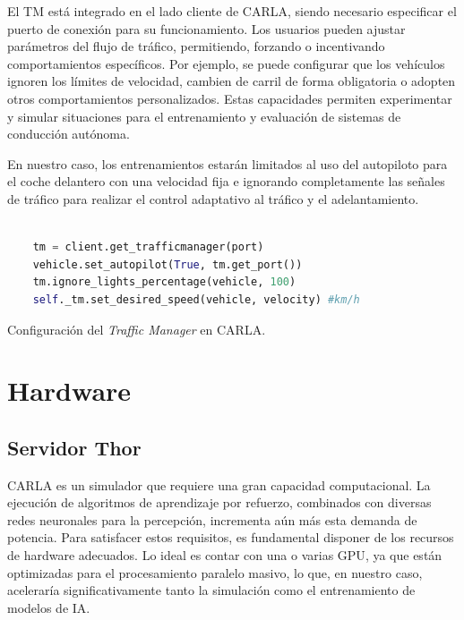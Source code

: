 El \ac{TM} está integrado en el lado cliente de CARLA, siendo necesario especificar el puerto de conexión para su funcionamiento. Los usuarios pueden ajustar parámetros del flujo de tráfico, permitiendo, forzando o incentivando comportamientos específicos. Por ejemplo, se puede configurar que los vehículos ignoren los límites de velocidad, cambien de carril de forma obligatoria o adopten otros comportamientos personalizados. Estas capacidades permiten experimentar y simular situaciones para el entrenamiento y evaluación de sistemas de conducción autónoma.

En nuestro caso, los entrenamientos estarán limitados al uso del autopiloto para el coche delantero con una velocidad fija e ignorando completamente las señales de tráfico para realizar el control adaptativo al tráfico y el adelantamiento. 

\begin{code}[h]
	\begin{lstlisting}[language=python]
	
	tm = client.get_trafficmanager(port)
	vehicle.set_autopilot(True, tm.get_port())  
	tm.ignore_lights_percentage(vehicle, 100) 
	self._tm.set_desired_speed(vehicle, velocity) #km/h
\end{lstlisting}
\caption[Configuración del \textit{Traffic Manager} en CARLA]{Configuración del \textit{Traffic Manager} en CARLA.}
\label{cod:tm_carla}
\end{code}

\section{Hardware}
\label{sec:hw}
\subsection{Servidor Thor}
\label{sec:thor}

CARLA es un simulador que requiere una gran capacidad computacional. La ejecución de algoritmos de aprendizaje por refuerzo, combinados con diversas redes neuronales para la percepción, incrementa aún más esta demanda de potencia. Para satisfacer estos requisitos, es fundamental disponer de los recursos de hardware adecuados. Lo ideal es contar con una o varias \ac{GPU}, ya que están optimizadas para el procesamiento paralelo masivo, lo que, en nuestro caso, aceleraría significativamente tanto la simulación como el entrenamiento de modelos de \ac{IA}. 

